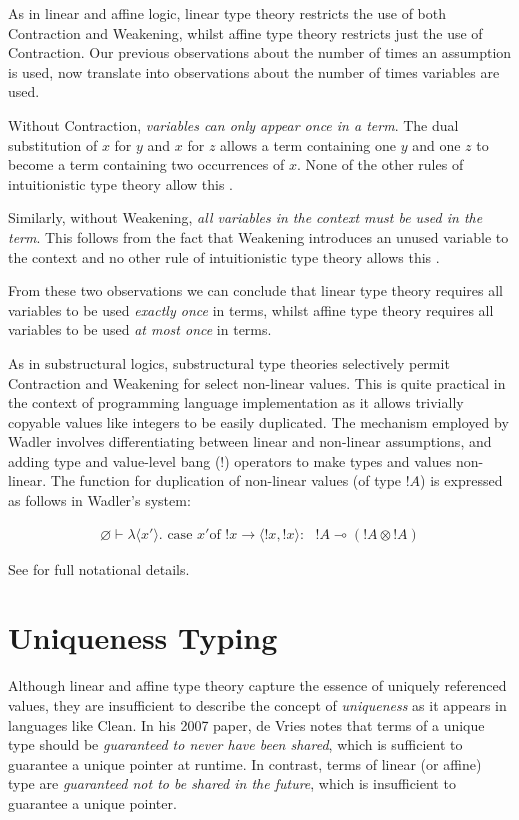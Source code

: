 \documentclass[]{unswthesis}
\newcommand{\case}{\text{ case }}
\newcommand{\of}{\text{of }}
\newcommand{\yields}{\multimap}
\let\i\textit
\begin{document}
As in linear and affine logic, linear type theory restricts the use of both Contraction and Weakening, whilst affine type theory restricts just the use of Contraction. Our previous observations about the number of times an assumption is used, now translate into observations about the number of times variables are used.

Without Contraction, \i{variables can only appear once in a term}. The dual substitution of $x$ for $y$ and $x$ for $z$ allows a term containing one $y$ and one $z$ to become a term containing two occurrences of $x$. None of the other rules of intuitionistic type theory allow this \cite{wadler93}.

Similarly, without Weakening, \i{all variables in the context must be used in the term}. This follows from the fact that Weakening introduces an unused variable to the context and no other rule of intuitionistic type theory allows this \cite{wadler93}.

From these two observations we can conclude that linear type theory requires all variables to be used \i{exactly once} in terms, whilst affine type theory requires all variables to be used \i{at most once} in terms.

As in substructural logics, substructural type theories selectively permit Contraction and Weakening for select non-linear values. This is quite practical in the context of programming language implementation as it allows trivially copyable values like integers to be easily duplicated. The mechanism employed by Wadler \cite{wadler93} involves differentiating between linear and non-linear assumptions, and adding type and value-level bang (!) operators to make types and values non-linear. The function for duplication of non-linear values (of type $!A$) is expressed as follows in Wadler's system:

\begin{eqnarray*}
\varnothing \vdash \lambda \langle x' \rangle . \case x' \of !x \rightarrow \langle !x, !x\rangle :\text{ } !A \yields (!A \otimes !A)
\end{eqnarray*}

See \cite{wadler93} for full notational details.

\section{Uniqueness Typing}

Although linear and affine type theory capture the essence of uniquely referenced values, they are insufficient to describe the concept of \i{uniqueness} as it appears in languages like Clean. In his 2007 paper, de Vries \cite{deVries07} notes that terms of a unique type should be \i{guaranteed to never have been shared}, which is sufficient to guarantee a unique pointer at runtime. In contrast, terms of linear (or affine) type are \i{guaranteed not to be shared in the future}, which is insufficient to guarantee a unique pointer.
\end{document}
